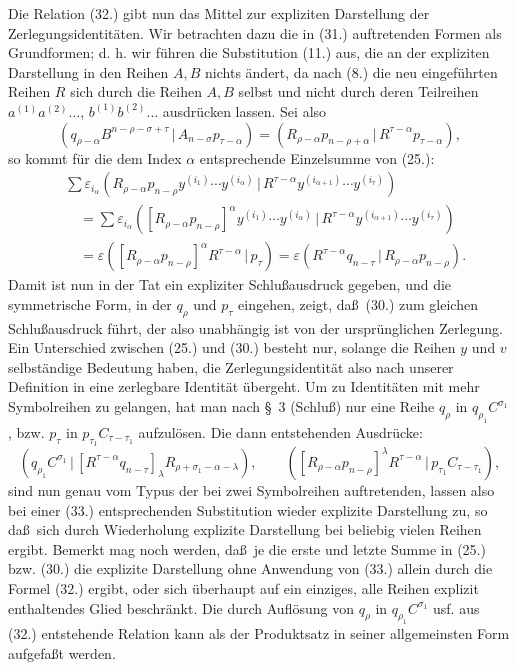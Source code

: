 \documentclass[11pt]{article}
\providecommand{\pair}[2]{(#1\,|\,#2)}
\providecommand{\eps}{\varepsilon}
\begin{document}
Die Relation (32.) gibt nun das Mittel zur expliziten Darstellung der Zerlegungsidentit\"aten. Wir betrachten dazu die in (31.) auftretenden Formen als Grundformen; d. h. wir f\"uhren die Substitution (11.) aus, die an der expliziten Darstellung in den Reihen $A,B$ nichts \"andert, da nach (8.) die neu eingef\"uhrten Reihen $R$ sich durch die Reihen $A,B$ selbst und nicht durch deren Teilreihen $a^{(1)}a^{(2)}\ldots$, $b^{(1)}b^{(2)}\ldots$ ausdr\"ucken lassen. Sei also
\begin{equation}
 \pair{q_{\rho-\alpha}B^{n-\rho-\sigma+\tau}}{A_{n-\sigma}p_{\tau-\alpha}}
 =\pair{R_{\rho-\alpha}p_{n-\rho+\alpha}}{R^{\tau-\alpha}p_{\tau-\alpha}},
\tag{33}
\end{equation}
so kommt f\"ur die dem Index $\alpha$ entsprechende Einzelsumme von (25.):
\begin{equation}
\begin{aligned}
&\sum \eps_{i_\alpha}\pair{R_{\rho-\alpha}p_{n-\rho}y^{(i_1)}\cdots y^{(i_\alpha)}}{R^{\tau-\alpha}y^{(i_{\alpha+1})}\cdots y^{(i_\tau)}}\\
&\quad=\sum \eps_{i_\alpha}\pair{[R_{\rho-\alpha}p_{n-\rho}]^\alpha y^{(i_1)}\cdots y^{(i_\alpha)}}{R^{\tau-\alpha}y^{(i_{\alpha+1})}\cdots y^{(i_\tau)}}\\
&\quad=\eps\pair{[R_{\rho-\alpha}p_{n-\rho}]^\alpha R^{\tau-\alpha}}{p_\tau}
 =\eps\pair{R^{\tau-\alpha}q_{n-\tau}}{R_{\rho-\alpha}p_{n-\rho}}.
\end{aligned}
\tag{34}
\end{equation}
Damit ist nun in der Tat ein expliziter Schlu\ss ausdruck gegeben, und die symmetrische Form, in der $q_\rho$ und $p_\tau$ eingehen, zeigt, da\ss\ (30.) zum gleichen Schlu\ss ausdruck f\"uhrt, der also unabh\"angig ist von der urspr\"unglichen Zerlegung. Ein Unterschied zwischen (25.) und (30.) besteht nur, solange die Reihen $y$ und $v$ selbst\"andige Bedeutung haben, die Zerlegungsidentit\"at also nach unserer Definition in eine zerlegbare Identit\"at \"ubergeht. Um zu Identit\"aten mit mehr Symbolreihen zu gelangen, hat man nach \S\ 3 (Schlu\ss) nur eine Reihe $q_\rho$ in $q_{\rho_1}C^{\sigma_1}$, bzw. $p_\tau$ in $p_{\tau_1}C_{\tau-\tau_1}$ aufzul\"osen. Die dann entstehenden Ausdr\"ucke:
\begin{equation}
 \pair{q_{\rho_1}C^{\sigma_1}}{[R^{\tau-\alpha}q_{n-\tau}]_\lambda R_{\rho+\sigma_1-\alpha-\lambda}},
 \qquad
 \pair{[R_{\rho-\alpha}p_{n-\rho}]^\lambda R^{\tau-\alpha}}{p_{\tau_1}C_{\tau-\tau_1}},
\tag{35}
\end{equation}
sind nun genau vom Typus der bei zwei Symbolreihen auftretenden, lassen also bei einer (33.) entsprechenden Substitution wieder explizite Darstellung zu, so da\ss\ sich durch Wiederholung explizite Darstellung bei beliebig vielen Reihen ergibt. Bemerkt mag noch werden, da\ss\ je die erste und letzte Summe in (25.) bzw. (30.) die explizite Darstellung ohne Anwendung von (33.) allein durch die Formel (32.) ergibt, oder sich \"uberhaupt auf ein einziges, alle Reihen explizit enthaltendes Glied beschr\"ankt. Die durch Aufl\"osung von $q_\rho$ in $q_{\rho_1}C^{\sigma_1}$ usf. aus (32.) entstehende Relation kann als der Produktsatz in seiner allgemeinsten Form aufgefa\ss t werden.
\end{document}
